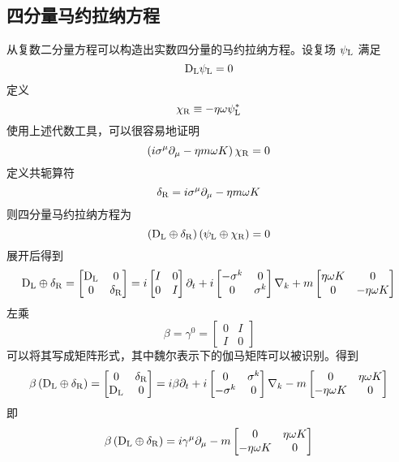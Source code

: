\subsection{四分量马约拉纳方程}  
从复数二分量方程可以构造出实数四分量的马约拉纳方程。设复场 \(\psi_{\rm{L}}\) 满足
\[
\mathrm{D}_{\rm{L}} \psi_{\rm{L}} = 0~
\]
定义
\[
\chi_{\rm{R}} \equiv -\eta \omega \psi_{\rm{L}}^{*}~
\]
使用上述代数工具，可以很容易地证明
\[
\left(i \sigma^{\mu} \partial_{\mu} - \eta m \omega K \right) \chi_{\rm{R}} = 0~
\]
定义共轭算符
\[
\delta_{\rm{R}} = i \sigma^{\mu} \partial_{\mu} - \eta m \omega K~
\]
则四分量马约拉纳方程为
\[
\left( \mathrm{D}_{\rm{L}} \oplus \delta_{\rm{R}} \right) \left( \psi_{\rm{L}} \oplus \chi_{\rm{R}} \right) = 0~
\]
展开后得到
\[
\mathrm{D}_{\rm{L}} \oplus \delta_{\rm{R}} = \begin{bmatrix} \mathrm{D}_{\rm{L}} & 0 \\ 0 & \delta_{\rm{R}} \end{bmatrix} = i \begin{bmatrix} I & 0 \\ 0 & I \end{bmatrix} \partial_{t} + i \begin{bmatrix} -\sigma^{k} & 0 \\ 0 & \sigma^{k} \end{bmatrix} \nabla_{k} + m \begin{bmatrix} \eta \omega K & 0 \\ 0 & -\eta \omega K \end{bmatrix}~
\]
左乘
\[
\beta = \gamma^{0} = \begin{bmatrix} 0 & I \\ I & 0 \end{bmatrix}~
\]
可以将其写成矩阵形式，其中魏尔表示下的伽马矩阵可以被识别。得到
\[
\beta \left( \mathrm{D}_{\rm{L}} \oplus \delta_{\rm{R}} \right) = \begin{bmatrix} 0 & \delta_{\rm{R}} \\ \mathrm{D}_{\rm{L}} & 0 \end{bmatrix} = i \beta \partial_{t} + i \begin{bmatrix} 0 & \sigma^{k} \\ -\sigma^{k} & 0 \end{bmatrix} \nabla_{k} - m \begin{bmatrix} 0 & \eta \omega K \\ -\eta \omega K & 0 \end{bmatrix}~
\]
即
\[
\beta \left( \mathrm{D}_{\rm{L}} \oplus \delta_{\rm{R}} \right) = i \gamma^{\mu} \partial_{\mu} - m \begin{bmatrix} 0 & \eta \omega K \\ -\eta \omega K & 0 \end{bmatrix}~
\]
